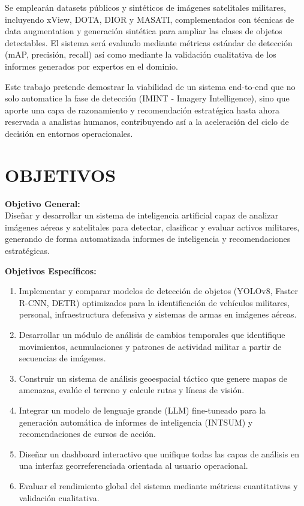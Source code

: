 \documentclass[12pt, a4paper]{article}
\begin{document}
Se emplearán datasets públicos y sintéticos de imágenes satelitales militares, incluyendo xView, DOTA, DIOR y MASATI, complementados con técnicas de data augmentation y generación sintética para ampliar las clases de objetos detectables. El sistema será evaluado mediante métricas estándar de detección (mAP, precisión, recall) así como mediante la validación cualitativa de los informes generados por expertos en el dominio. 

Este trabajo pretende demostrar la viabilidad de un sistema end-to-end que no solo automatice la fase de detección (IMINT - Imagery Intelligence), sino que aporte una capa de razonamiento y recomendación estratégica hasta ahora reservada a analistas humanos, contribuyendo así a la aceleración del ciclo de decisión en entornos operacionales.

\newpage

\section*{OBJETIVOS} 

\textbf{Objetivo General:}  \\
Diseñar y desarrollar un sistema de inteligencia artificial capaz de analizar imágenes aéreas y satelitales para detectar, clasificar y evaluar activos militares, generando de forma automatizada informes de inteligencia y recomendaciones estratégicas.

\textbf{Objetivos Específicos:} 
\begin{enumerate}[label=\arabic*.]
    \item Implementar y comparar modelos de detección de objetos (YOLOv8, Faster R-CNN, DETR) optimizados para la identificación de vehículos militares, personal, infraestructura defensiva y sistemas de armas en imágenes aéreas.
    \item Desarrollar un módulo de análisis de cambios temporales que identifique movimientos, acumulaciones y patrones de actividad militar a partir de secuencias de imágenes.
    \item Construir un sistema de análisis geoespacial táctico que genere mapas de amenazas, evalúe el terreno y calcule rutas y líneas de visión.
    \item Integrar un modelo de lenguaje grande (LLM) fine-tuneado para la generación automática de informes de inteligencia (INTSUM) y recomendaciones de cursos de acción.
    \item Diseñar un dashboard interactivo que unifique todas las capas de análisis en una interfaz georreferenciada orientada al usuario operacional.
    \item Evaluar el rendimiento global del sistema mediante métricas cuantitativas y validación cualitativa.
\end{enumerate}
\end{document}

